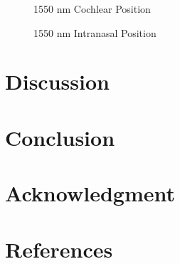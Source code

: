 \documentclass[journal,twoside,web]{ieeecolor}
\begin{document}
\begin{figure}[!htb]
    \caption{\label{fig:1550-Cochlear} 1550 nm Cochlear Position}
\end{figure}

\begin{figure}[!htb]
    \caption{\label{fig:1550-Intra} 1550 nm Intranasal Position}
\end{figure}

\section{Discussion}
\label{sec:next steps}

\section{Conclusion}
\label{sec:conclusion}

\section*{Acknowledgment}

\section*{References}
\end{document}
